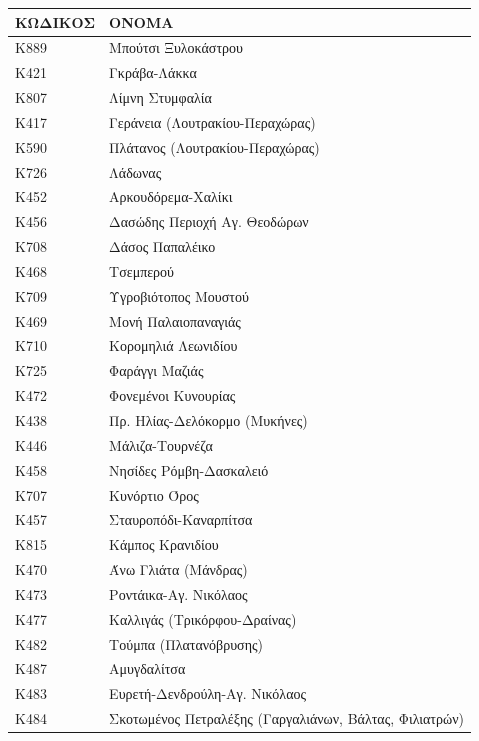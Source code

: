 \documentclass[12pt]{article}
\begin{document}
	\begin{table}[H]
		\centering
		
		\label{my-label}
		\begin{tabular}{ll}
			\hline
			\textbf{ΚΩΔΙΚΟΣ}         & \textbf{ΟΝΟΜΑ}          \\ \hline
			Κ889                     & Μπούτσι Ξυλοκάστρου  \\
			Κ421                     & Γκράβα-Λάκκα \\
			Κ807                     & Λίμνη Στυμφαλία \\
			Κ417                     & Γεράνεια (Λουτρακίου-Περαχώρας) \\
			Κ590                     & Πλάτανος (Λουτρακίου-Περαχώρας) \\
			Κ726                     & Λάδωνας \\
			Κ452					 & Αρκουδόρεμα-Χαλίκι \\
			Κ456					 & Δασώδης Περιοχή Αγ. Θεοδώρων \\
			Κ708 					 & Δάσος Παπαλέικο \\
			Κ468					 & Τσεμπερού \\
			Κ709					 & Υγροβιότοπος Μουστού \\
			Κ469					 & Μονή Παλαιοπαναγιάς \\
			Κ710					 & Κορομηλιά Λεωνιδίου \\
			Κ725					 & Φαράγγι Μαζιάς \\
			Κ472					 & Φονεμένοι Κυνουρίας \\
			Κ438					 & Πρ. Ηλίας-Δελόκορμο (Μυκήνες) \\
			Κ446					 & Μάλιζα-Τουρνέζα \\
			Κ458			 		& Νησίδες Ρόμβη-Δασκαλειό \\
			Κ707					& Κυνόρτιο  Όρος \\
			Κ457					& Σταυροπόδι-Καναρπίτσα \\
			Κ815					& Κάμπος Κρανιδίου \\
			Κ470					& Άνω Γλιάτα (Μάνδρας) \\
			Κ473					& Ροντάικα-Αγ. Νικόλαος\\
			Κ477					& Καλλιγάς (Τρικόρφου-Δραίνας) \\
			Κ482					& Τούμπα (Πλατανόβρυσης) \\
			Κ487					& Αμυγδαλίτσα \\
			Κ483 					& Ευρετή-Δενδρούλη-Αγ. Νικόλαος \\
			Κ484			  		& Σκοτωμένος Πετραλέξης (Γαργαλιάνων, Βάλτας, Φιλιατρών) \\

\end{tabular}
\end{table}
\end{document}
